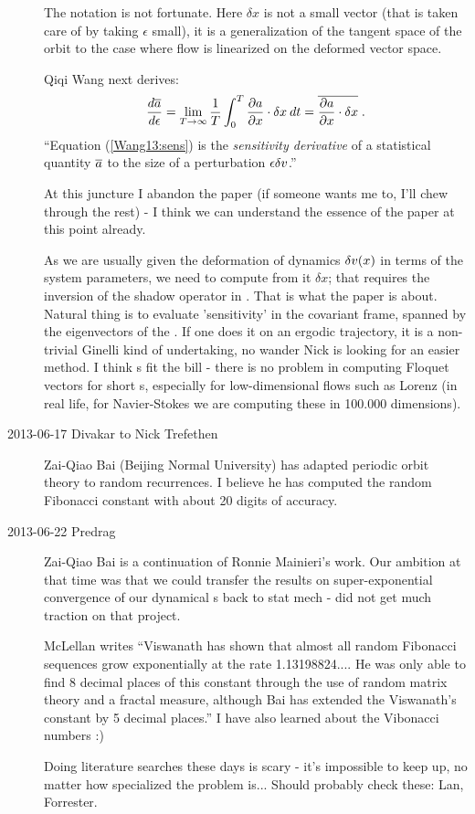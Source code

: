 \begin{description}
The notation is not fortunate. Here $\delta x$ is not a small vector
(that is taken care of by taking $\epsilon$ small), it is a
generalization of the tangent space of the orbit to the case where
flow is linearized on the deformed vector space.

Qiqi Wang next derives:
\begin{equation} \label{Wang13:sens}
\frac{d \overline{a}}{d\epsilon}
= \lim_{T\rightarrow\infty}
\frac1T \int_0^T \frac{\partial a}{\partial x} \cdot \delta x\:dt
= \overline{
\frac{\partial a}{\partial x} \cdot \delta x } \;.
\end{equation}
``Equation (\ref{Wang13:sens}) is the \emph{sensitivity derivative} of
a statistical quantity $\overline{a}$ to the size of a
perturbation $\epsilon\delta v$.''

At this juncture I abandon the paper (if someone wants me to, I'll chew
through the rest) - I think we can understand  the essence of the
paper at this point already.

As we are usually given the deformation of dynamics $\delta
v(x)$ in terms of the system parameters, we need to compute from
it $\delta x$; that requires the inversion of the  shadow operator in
. That is what the paper is about. Natural thing is to
evaluate 'sensitivity' in the covariant frame, spanned by
the eigenvectors of the \JacobianM.
If one does
it on an ergodic trajectory, it is a non-trivial
Ginelli \etal{} kind of undertaking, no wander Nick
is looking for an easier method. I think \po s fit the bill - there
is no problem in computing Floquet vectors for short \po s,
especially for low-dimensional flows such as Lorenz (in real life,
for Navier-Stokes we are computing these in 100.000 dimensions).

\item[2013-06-17 Divakar to Nick Trefethen]
Zai-Qiao Bai (Beijing Normal University) has adapted periodic orbit
theory to random recurrences. I believe he has
computed the random Fibonacci constant with about 20 digits of
accuracy.

\item[2013-06-22 Predrag]
Zai-Qiao Bai is a continuation of Ronnie
Mainieri's work. Our ambition at that
time was that we could transfer the results on super-exponential
convergence of our dynamical \Fd s back to stat mech - did not
get much traction on that project.

McLellan writes ``Viswanath has shown that almost all
random Fibonacci sequences grow exponentially at the rate
1.13198824.... He was only able to find 8 decimal places of this
constant through the use of random matrix theory and a fractal
measure, although Bai has extended the Viswanath's constant by 5
decimal places.'' I have also learned about the Vibonacci numbers :)

Doing literature searches these days is scary - it's impossible to keep up,
no matter how specialized the problem is... Should probably check these:
Lan,
Forrester.



\end{description}
